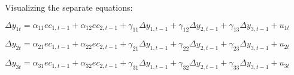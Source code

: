 \documentclass[10pt, a4paper, landscape]{article}
\begin{document}
\begin{multicols}{2}
Visualizing the separate equations:

\begin{center}
	\( \Delta y_{1t} = \alpha_{11} ec_{1, t - 1} + \alpha_{12} ec_{2, t - 1}  + \gamma_{11} \Delta y_{1, t - 1} + \gamma_{12} \Delta y_{2, t - 1} + \gamma_{13} \Delta y_{3, t - 1} + u_{1t} \)

	\( \Delta y_{2t} = \alpha_{21} ec_{1, t - 1} + \alpha_{22} ec_{2, t - 1}  + \gamma_{21} \Delta y_{1, t - 1} + \gamma_{22} \Delta y_{2, t - 1} + \gamma_{23} \Delta y_{3, t - 1} + u_{2t} \)

	\( \Delta y_{3t} = \alpha_{31} ec_{1, t - 1} + \alpha_{32} ec_{2, t - 1}  + \gamma_{31} \Delta y_{1, t - 1} + \gamma_{32} \Delta y_{2, t - 1} + \gamma_{33} \Delta y_{3, t - 1} + u_{3t} \)
\end{center}

\end{multicols}
\end{document}
